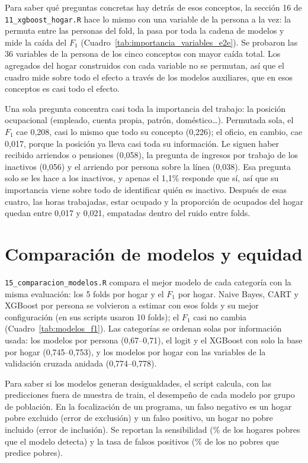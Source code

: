 \documentclass[12pt]{article}
\begin{document}
Para saber qué preguntas concretas hay detrás de esos conceptos, la sección
16 de \texttt{11\_xgboost\_hogar.R} hace lo mismo con una variable de la
persona a la vez: la permuta entre las personas del fold, la pasa por toda la
cadena de modelos y mide la caída del $F_1$
(Cuadro~\ref{tab:importancia_variables_e2e}). Se probaron las 36 variables de
la persona de los cinco conceptos con mayor caída total. Los agregados del
hogar construidos con cada variable no se permutan, así que el cuadro mide
sobre todo el efecto a través de los modelos auxiliares, que en esos
conceptos es casi todo el efecto.



Una sola pregunta concentra casi toda la importancia del trabajo: la posición
ocupacional (empleado, cuenta propia, patrón, doméstico\ldots). Permutada
sola, el $F_1$ cae 0,208, casi lo mismo que todo su concepto (0,226); el
oficio, en cambio, cae 0,017, porque la posición ya lleva casi toda su
información. Le siguen haber recibido arriendos o pensiones (0,058), la
pregunta de ingresos por trabajo de los inactivos (0,056) y el arriendo por
persona sobre la línea (0,038). Esa pregunta solo se les hace a los
inactivos, y apenas el 1,1\% responde que sí, así que su importancia viene
sobre todo de identificar quién es inactivo. Después de esas cuatro, las
horas trabajadas, estar ocupado y la proporción de ocupados del hogar
quedan entre 0,017 y 0,021, empatadas dentro del ruido entre folds.

\section{Comparación de modelos y equidad}
\label{sec:equidad}

\texttt{15\_comparacion\_modelos.R} compara el mejor modelo de cada categoría
con la misma evaluación: los 5 folds por hogar y el $F_1$ por hogar.
Naive Bayes, CART y XGBoost por persona se volvieron a estimar con esos folds
y su mejor configuración (en sus scripts usaron 10 folds); el $F_1$ casi no
cambia (Cuadro~\ref{tab:modelos_f1}). Las categorías se ordenan solas por
información usada: los modelos por persona (0,67--0,71), el logit y el
XGBoost con solo la base por hogar (0,745--0,753), y los modelos por hogar
con las variables de la validación cruzada anidada (0,774--0,778).



Para saber si los modelos generan desigualdades, el script calcula, con las
predicciones fuera de muestra de train, el desempeño de cada modelo por grupo
de población. En la focalización de un programa, un falso negativo es un
hogar pobre excluido (error de exclusión) y un falso positivo, un hogar no
pobre incluido (error de inclusión). Se reportan la sensibilidad (\% de los
hogares pobres que el modelo detecta) y la tasa de falsos positivos (\% de los
no pobres que predice pobres).
\end{document}
